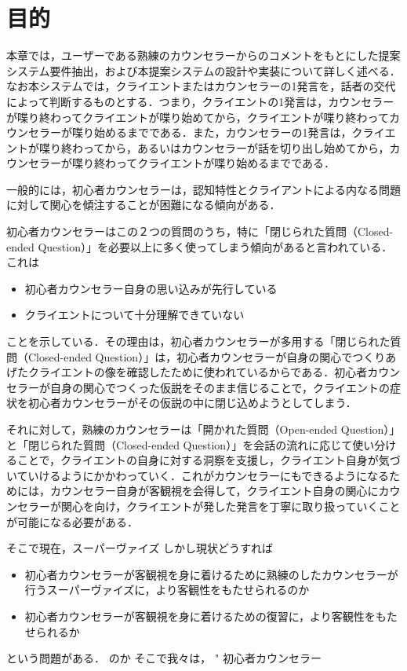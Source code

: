 \documentclass[shuuron]{kuee}
\begin{document}
\section{目的}

本章では，ユーザーである熟練のカウンセラーからのコメントをもとにした提案システム要件抽出，および本提案システムの設計や実装について詳しく述べる．なお本システムでは，クライエントまたはカウンセラーの1発言を，話者の交代によって判断するものとする．つまり，クライエントの1発言は，カウンセラーが喋り終わってクライエントが喋り始めてから，クライエントが喋り終わってカウンセラーが喋り始めるまでである．また，カウンセラーの1発言は，クライエントが喋り終わってから，あるいはカウンセラーが話を切り出し始めてから，カウンセラーが喋り終わってクライエントが喋り始めるまでである．


一般的には，初心者カウンセラーは，認知特性とクライアントによる内なる問題に対して関心を傾注することが困難になる傾向がある．

初心者カウンセラーはこの２つの質問のうち，特に「閉じられた質問（Closed-ended Question）」を必要以上に多く使ってしまう傾向があると言われている．これは

\begin{itemize}
\item 初心者カウンセラー自身の思い込みが先行している
\item クライエントについて十分理解できていない
\end{itemize}
ことを示している．その理由は，初心者カウンセラーが多用する「閉じられた質問（Closed-ended Question）」は，初心者カウンセラーが自身の関心でつくりあげたクライエントの像を確認したために使われているからである．初心者カウンセラーが自身の関心でつくった仮説をそのまま信じることで，クライエントの症状を初心者カウンセラーがその仮説の中に閉じ込めようとしてしまう．

それに対して，熟練のカウンセラーは「開かれた質問（Open-ended Question）」と「閉じられた質問（Closed-ended Question）」を会話の流れに応じて使い分けることで，クライエントの自身に対する洞察を支援し，クライエント自身が気づいていけるようにかかわっていく．これがカウンセラーにもできるようになるためには，カウンセラー自身が客観視を会得して，クライエント自身の関心にカウンセラーが関心を向け，クライエントが発した発言を丁寧に取り扱っていくことが可能になる必要がある．

そこで現在，スーパーヴァイズ
しかし現状どうすれば
\begin{itemize}
\item 初心者カウンセラーが客観視を身に着けるために熟練のしたカウンセラーが行うスーパーヴァイズに，より客観性をもたせられるのか
\item 初心者カウンセラーが客観視を身に着けるための復習に，より客観性をもたせられるか
\end{itemize}
という問題がある．
のか
そこで我々は，
"	初心者カウンセラー
\end{document}

